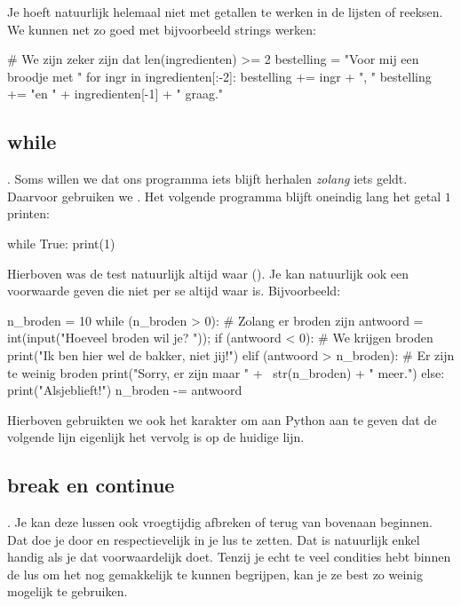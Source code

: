   Je hoeft natuurlijk helemaal niet met getallen te werken in de lijsten of
  reeksen. We kunnen net zo goed met bijvoorbeeld strings werken:
  \begin{python}
    # We zijn zeker zijn dat len(ingredienten) >= 2
    bestelling = "Voor mij een broodje met "
    for ingr in ingredienten[:-2]:
      bestelling += ingr + ", "
    bestelling += "en " + ingredienten[-1] + " graag."
  \end{python}

  \subsection{while}. Soms willen we dat ons programma iets blijft herhalen
  \emph{zolang} iets geldt. Daarvoor gebruiken we . Het volgende
  programma blijft oneindig lang het getal $1$ printen:
  \begin{python}
    while True:
      print(1)
  \end{python}
  Hierboven was de test natuurlijk altijd waar (). Je kan natuurlijk
  ook een voorwaarde geven die niet per se altijd waar is. Bijvoorbeeld:
  \begin{python}
    n_broden = 10
    while (n_broden > 0):         # Zolang er broden zijn
      antwoord = int(input("Hoeveel broden wil je? "));
      if (antwoord < 0):          # We krijgen broden
        print("Ik ben hier wel de bakker, niet jij!")
      elif (antwoord > n_broden): # Er zijn te weinig broden
        print("Sorry, er zijn maar " + \
          str(n_broden) + " meer.")
      else:
        print("Alsjeblieft!")
        n_broden -= antwoord
  \end{python}
  Hierboven gebruikten we ook het karakter \py{\textbackslash} om aan Python
  aan te geven dat de volgende lijn eigenlijk het vervolg is op de huidige
  lijn.

  \subsection{break en continue}. Je kan deze lussen ook vroegtijdig afbreken
  of terug van bovenaan beginnen. Dat doe je door \py{break} en \py{continue}
  respectievelijk in je lus te zetten. Dat is natuurlijk enkel handig als je dat
  voorwaardelijk doet. Tenzij je echt te veel condities hebt binnen de lus om het
  nog gemakkelijk te kunnen begrijpen, kan je ze best zo weinig mogelijk te
  gebruiken.

